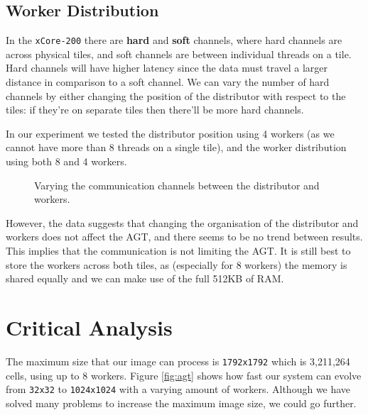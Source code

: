 \documentclass{article}
\begin{document}
    \subsection{Worker Distribution} 
    \label{workerdistribution}

    In the \verb|xCore-200| there are \textbf{hard} and \textbf{soft} channels, where hard channels are across physical tiles, and soft channels are between individual threads on a tile. Hard channels will have higher latency since the data must travel a larger distance in comparison to a soft channel. We can vary the number of hard channels by either changing the position of the distributor with respect to the tiles: if they're on separate tiles then there'll be more hard channels.

    In our experiment we tested the distributor position using 4 workers (as we cannot have more than 8 threads on a single tile), and the worker distribution using both 8 and 4 workers.

    \begin{figure}[h]
        \begin{center}
            
            \caption{Varying the communication channels between the distributor and workers.}
            \label{fig:distribution}
        \end{center}
    \end{figure}

    However, the data suggests that changing the organisation of the distributor and workers does not affect the AGT, and there seems to be no trend between results. This implies that the communication is not limiting the AGT. It is still best to store the workers across both tiles, as (especially for 8 workers) the memory is shared equally and we can make use of the full 512KB of RAM. 
    
    \pagebreak

    \section{Critical Analysis} 
    \label{analysis}

    The maximum size that our image can process is \verb|1792x1792| which is 3,211,264 cells, using up to 8 workers. Figure \ref{fig:agt} shows how fast our system can evolve from \verb|32x32| to \verb|1024x1024| with a varying amount of workers. Although we have solved many problems to increase the maximum image size, we could go further. 
\end{document}
